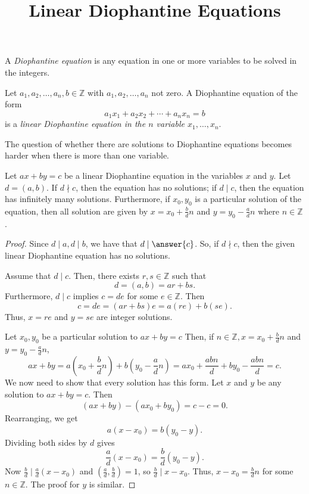 \documentclass{ximera}
\title{Linear Diophantine Equations}
\begin{document}
\begin{abstract}
\end{abstract}
\maketitle


\begin{definition}
    A \emph{Diophantine equation} is any equation in one or more variables to be solved in the integers.
\end{definition}
    
    
\begin{definition}
    Let $a_1,a_2,\dots,a_n,b\in\mathbb{Z}$ with $a_1,a_2,\dots,a_n$ not zero. A Diophantine equation of the form \[a_1x_1+a_2x_2+\cdots+a_nx_n=b\] is a \emph{linear Diophantine equation in the $n$ variable $x_1,\dots,x_n$}.
\end{definition}
    
The question of whether there are solutions to Diophantine equations becomes harder when there is more than one variable.
    
\begin{theorem}\label{thm:linear-dioph}
    Let $ax+by=c$ be a linear Diophantine equation in the variables $x$ and $y$. Let $d=(a,b)$. If $d\nmid c$, then the equation has no solutions; if $d\mid c$, then the equation has infinitely many solutions. Furthermore, if $x_0,y_0$ is a particular solution of the equation, then all solution are given by $x=x_0+\frac{b}{d}n$ and $y=y_0-\frac{a}{d}n$ where $n\in\mathbb{Z}$.
   
    \begin{proof}
        Since $d\mid a,d\mid b$, we have that $d\mid\answer{c}$. So, if $d\nmid c$, then the given linear Diophantine equation has no solutions.
     
        Assume that $d\mid c$. Then, there exists $r,s\in\mathbb{Z}$ such that \[d=(a,b)=ar+bs.\] Furthermore, $d\mid c$ implies $c=de$ for some $e\in\mathbb{Z}$. Then \[c=de=(ar+bs)e=a(re)+b(se).\]
        Thus, $x=re$ and $y=se$ are integer solutions.
     
        Let $x_0,y_0$ be a particular solution to $ax+by=c$ Then, if $n\in\mathbb{Z}, x=x_0+\frac{b}{d}n$ and $y=y_0-\frac{a}{d}n$, \[ax+by=a(x_0+\frac{b}{d}n)+b(y_0-\frac{a}{d}n)=ax_0+\frac{abn}{d}+by_0-\frac{abn}{d}=c.\] We now need to show that every solution has this form. Let $x$ and $y$ be any solution to $ax+by=c$. Then \[(ax+by)-(ax_0+by_0)=c-c=0.\] Rearranging, we get \[a(x-x_0)=b(y_0-y).\] Dividing both sides by $d$ gives \[\frac{a}{d}(x-x_0)=\frac{b}{d}(y_0-y).\] Now $\frac{b}{d}\mid \frac{a}{d}(x-x_0)$ and $(\frac{a}{d},\frac{b}{d})=1$, so $\frac{b}{d}\mid x-x_0$. Thus, $x-x_0=\frac{b}{d}n$ for some $n\in\mathbb{Z}$. The proof for $y$ is similar.
    \end{proof}
\end{theorem}
    
\end{document}

